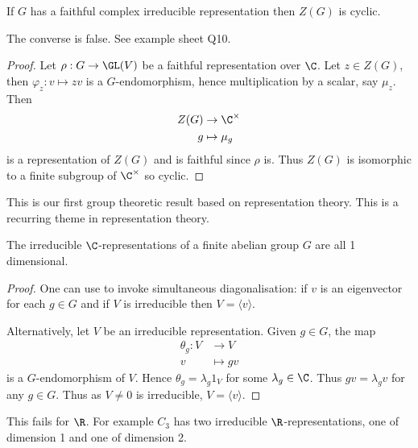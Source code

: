 \documentclass[a4paper]{article}
\begin{document}
\begin{corollary}
  If \(G\) has a faithful complex irreducible representation then \(Z(G)\) is cyclic.
\end{corollary}

\begin{remark}
  The converse is false. See example sheet Q10.
\end{remark}

\begin{proof}
  Let \(\rho: G \to \GL(V)\) be a faithful representation over \(\C\). Let \(z \in Z(G)\), then \(\varphi_z: v \mapsto zv\) is a \(G\)-endomorphism, hence multiplication by a scalar, say \(\mu_z\). Then
  \begin{align*}
    Z(G) &\to \C^\times \\
    g &\mapsto \mu_g
  \end{align*}
  is a representation of \(Z(G)\) and is faithful since \(\rho\) is. Thus \(Z(G)\) is isomorphic to a finite subgroup of \(\C^\times\) so cyclic.
\end{proof}

This is our first group theoretic result based on representation theory. This is a recurring theme in representation theory.

\begin{corollary}
  The irreducible \(\C\)-representations of a finite abelian group \(G\) are all 1 dimensional.
\end{corollary}

\begin{proof}
  One can use  to invoke simultaneous diagonalisation: if \(v\) is an eigenvector for each \(g \in G\) and if \(V\) is irreducible then \(V = \langle v \rangle\).

  Alternatively, let \(V\) be an irreducible representation. Given \(g \in G\), the map
  \begin{align*}
    \theta_g: V &\to V \\
    v &\mapsto gv
  \end{align*}
  is a \(G\)-endomorphism of \(V\). Hence \(\theta_g = \lambda_g 1_V\) for some \(\lambda_g \in \C\). Thus \(gv = \lambda_g v\) for any \(g \in G\). Thus as \(V \neq 0\) is irreducible, \(V = \langle v \rangle\).
\end{proof}

\begin{remark}
  This fails for \(\R\). For example \(C_3\) has two irreducible \(\R\)-representations, one of dimension 1 and one of dimension 2.
\end{remark}
\end{document}
